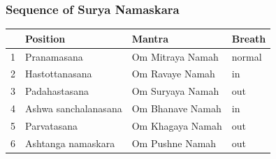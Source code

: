 \begin{frame}[fragile]\frametitle{Sequence of Surya Namaskara}

        \begin{center}
        {\small
        \begin{tabular}{@{}rlll@{}}
        \toprule
        & \textbf{Position} & \textbf{Mantra} & \textbf{Breath} \\
        \midrule
        1 & Pranamasana & Om Mitraya Namah & normal \\
        2 & Hastottanasana & Om Ravaye Namah & in \\
        3 & Padahastasana & Om Suryaya Namah & out \\
        4 & Ashwa sanchalanasana & Om Bhanave Namah & in \\
        5 & Parvatasana & Om Khagaya Namah & out \\
        6 & Ashtanga namaskara & Om Pushne Namah & out \\
        \bottomrule
        \end{tabular}}
        \end{center}


\end{frame}

